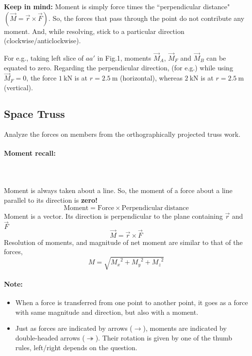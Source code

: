 \documentclass{article}
\newcommand{\para}[1]{\paragraph{#1}\mbox{}\\}
\begin{document}
{\begin{enumerate}[(a)]
\textbf{\Large Keep in mind:} Moment is simply force times the ``perpendicular distance" $(\vec M=\vec r\times \vec F)$. So, the forces that pass through the point do not contribute any moment. And, while resolving, stick to a particular direction (clockwise/anticlockwise).
\newline

For e.g., taking left slice of $aa'$ in Fig.1, moments $\vec M_A$, $\vec M_F$ and $\vec M_B$ can be equated to zero. Regarding the perpendicular direction, (for e.g.) while using $\vec M_F=0$, the force $\mathrm{1\ kN}$ is at $r=\mathrm{2.5\ m}$ (horizontal), whereas $\mathrm{2\ kN}$ is at $r=\mathrm{2.5\ m}$ (vertical).
\end{enumerate}
\newpage
\subsection{\LARGE Space Truss}
Analyze the forces on members from the orthographically projected truss work.
\para{\Large Moment recall:}
\\
Moment is always taken about a line. So, the moment of a force about a line parallel to its direction is \textbf{zero!}
$$\mathrm{Moment=Force\times Perpendicular\ distance}$$
Moment is a vector. Its direction is perpendicular to the plane containing $\vec r$ and $\vec F$
{\LARGE $$\vec M=\vec r \times \vec F$$}
Resolution of moments, and magnitude of net moment are similar to that of the forces,
{\LARGE $$M=\sqrt{{M_x}^2+{M_y}^2+{M_z}^2}$$}
\paragraph{\Large Note:}
\begin{itemize}
\item When a force is transferred from one point to another point, it goes as a force with same magnitude and direction, but also with a moment.
\item Just as forces are indicated by arrows ($\rightarrow $), moments are indicated by double-headed arrows ({\huge $\twoheadrightarrow $}). Their rotation is given by one of the thumb rules, left/right depends on the question.
\end{itemize}
\newpage
}
\end{document}
